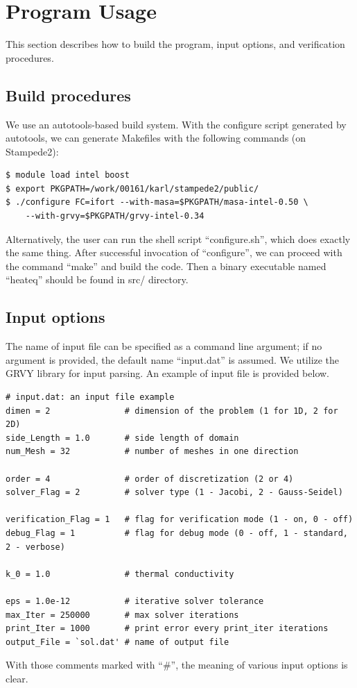 \documentclass{article}
\begin{document}
\section{Program Usage}
This section describes how to build the program, input options, and verification procedures.

\subsection{Build procedures}
We use an autotools-based build system. With the configure script generated by autotools, we can generate
Makefiles with the following commands (on Stampede2):

\begin{verbatim}
$ module load intel boost
$ export PKGPATH=/work/00161/karl/stampede2/public/
$ ./configure FC=ifort --with-masa=$PKGPATH/masa-intel-0.50 \
    --with-grvy=$PKGPATH/grvy-intel-0.34
\end{verbatim}
Alternatively, the user can run the shell script ``configure.sh'', which does exactly the same thing.
After successful invocation of ``configure'', we can proceed with the command ``make'' and build the code.
Then a binary executable named ``heateq'' should be found in src/ directory.

\subsection{Input options}
The name of input file can be specified as a command line argument; if no argument is provided, the
default name ``input.dat'' is assumed. We utilize the GRVY library for input parsing. An example of input file is provided below.

\begin{verbatim}
# input.dat: an input file example
dimen = 2               # dimension of the problem (1 for 1D, 2 for 2D) 
side_Length = 1.0       # side length of domain
num_Mesh = 32           # number of meshes in one direction

order = 4               # order of discretization (2 or 4)
solver_Flag = 2         # solver type (1 - Jacobi, 2 - Gauss-Seidel)

verification_Flag = 1   # flag for verification mode (1 - on, 0 - off)
debug_Flag = 1          # flag for debug mode (0 - off, 1 - standard, 2 - verbose)

k_0 = 1.0               # thermal conductivity

eps = 1.0e-12           # iterative solver tolerance
max_Iter = 250000       # max solver iterations
print_Iter = 1000       # print error every print_iter iterations
output_File = `sol.dat' # name of output file
\end{verbatim}
With those comments marked with ``\#'', the meaning of various input options is clear.
\end{document}
